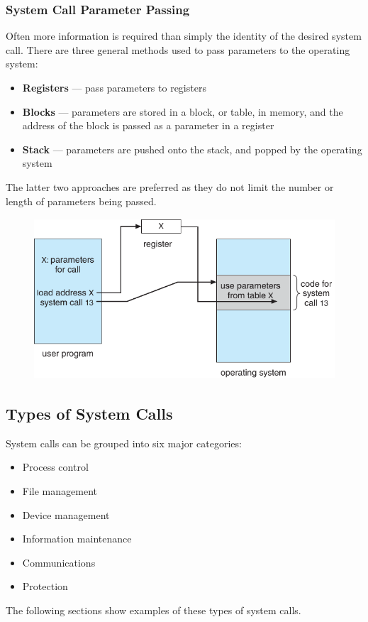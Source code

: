 \documentclass{article}
\begin{document}
\subsubsection{System Call Parameter Passing}
Often more information is required than simply the identity of the
desired system call. There are three general methods used to pass
parameters to the operating system:
\begin{itemize}
    \item \textbf{Registers} --- pass parameters to registers
    \item \textbf{Blocks} --- parameters are stored in a block, or
          table, in memory, and the address of the block is passed as a
          parameter in a register
    \item \textbf{Stack} --- parameters are pushed onto the stack, and
          popped by the operating system
\end{itemize}
The latter two approaches are preferred as they do not limit the number
or length of parameters being passed.
\begin{figure}[H]
    \centering
    \includegraphics[height = 6cm]{figures/system_call_param_pass.pdf}
\end{figure}
\subsection{Types of System Calls}
System calls can be grouped into six major categories:
\begin{itemize}
    \item Process control
    \item File management
    \item Device management
    \item Information maintenance
    \item Communications
    \item Protection
\end{itemize}
The following sections show examples of these types of system calls.
\end{document}
